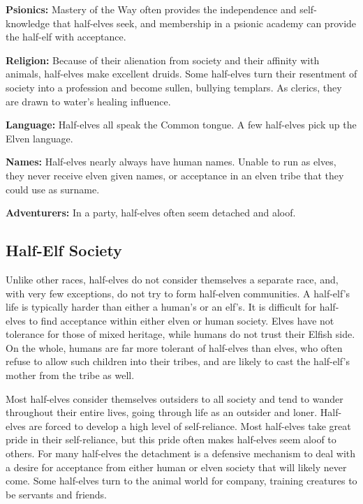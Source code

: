 \textbf{Psionics:} Mastery of the Way often provides the independence and self-knowledge that half-elves seek, and membership in a psionic academy can provide the half-elf with acceptance.

\textbf{Religion:} Because of their alienation from society and their affinity with animals, half-elves make excellent druids. Some half-elves turn their resentment of society into a profession and become sullen, bullying templars. As clerics, they are drawn to water's healing influence.

\textbf{Language:} Half-elves all speak the Common tongue. A few half-elves pick up the Elven language.

\textbf{Names:} Half-elves nearly always have human names. Unable to run as elves, they never receive elven given names, or acceptance in an elven tribe that they could use as surname.

\textbf{Adventurers:} In a party, half-elves often seem detached and aloof.

\subsection{Half-Elf Society}
Unlike other races, half-elves do not consider themselves a separate race, and, with very few exceptions, do not try to form half-elven communities. A half-elf's life is typically harder than either a human's or an elf's. It is difficult for half-elves to find acceptance within either elven or human society. Elves have not tolerance for those of mixed heritage, while humans do not trust their Elfish side. On the whole, humans are far more tolerant of half-elves than elves, who often refuse to allow such children into their tribes, and are likely to cast the half-elf's mother from the tribe as well.

Most half-elves consider themselves outsiders to all society and tend to wander throughout their entire lives, going through life as an outsider and loner. Half-elves are forced to develop a high level of self-reliance. Most half-elves take great pride in their self-reliance, but this pride often makes half-elves seem aloof to others. For many half-elves the detachment is a defensive mechanism to deal with a desire for acceptance from either human or elven society that will likely never come. Some half-elves turn to the animal world for company, training creatures to be servants and friends.

